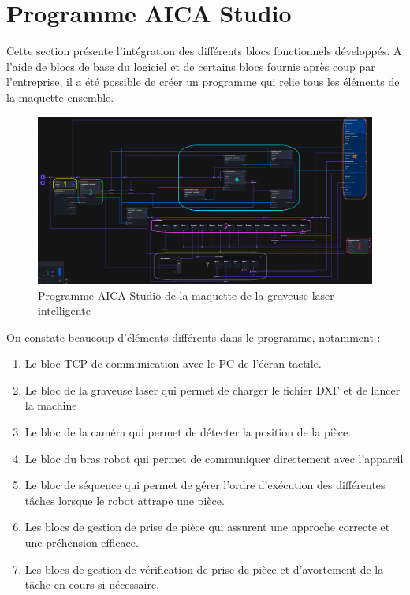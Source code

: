 \section{Programme AICA Studio}

Cette section présente l'intégration des différents blocs fonctionnels développés. A l'aide de blocs de base du logiciel et de certains blocs fournis après coup par l'entreprise, il a été possible de créer un programme qui relie tous les éléments de la maquette ensemble.

\begin{figure}[H]
    \centering
    \includegraphics[width=1\textwidth]{assets/figures/AICA_PROG.png}
    \caption{Programme AICA Studio de la maquette de la graveuse laser intelligente}
    \label{fig:aica_programme}
\end{figure}

On constate beaucoup d'éléments différents dans le programme, notamment :
\begin{enumerate}
    \item Le bloc TCP de communication avec le PC de l'écran tactile.
    \item Le bloc de la graveuse laser qui permet de charger le fichier DXF et de lancer la machine
    \item Le bloc de la caméra qui permet de détecter la position de la pièce.
    \item Le bloc du bras robot qui permet de communiquer directement avec l'appareil
    \item Le bloc de séquence qui permet de gérer l'ordre d'exécution des différentes tâches lorsque le robot attrape une pièce.
    \item Les blocs de gestion de prise de pièce qui assurent une approche correcte et une préhension efficace.
    \item Les blocs de gestion de vérification de prise de pièce et d'avortement de la tâche en cours si nécessaire.
\end{enumerate}

